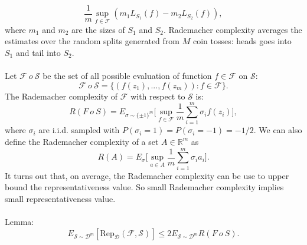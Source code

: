 \documentclass{article}
\begin{document}
   \begin{equation}
   \frac{1}{m} \sup_{f \in \mathcal{F}} (m_1L_{S_1}(f) - m_2L_{S_2}(f)), 
   \end{equation}
   where $m_1$ and $m_2$ are the sizes of $S_1$ and $S_2$. Rademacher complexity averages the estimates over the random splits generated from $M$ coin tosses: heads goes into $S_1$ and tail into $S_2$.
   \\\\
   Let $\mathcal{F}\ o\ \mathcal{S}$ be the set of all possible evaluation of function $f\in \mathcal{F}$ on $\mathcal{S}$:
   \begin{equation}
   \mathcal{F}\ o\ \mathcal{S} = \{ (f(z_1),...,f(z_m)):f\in \mathcal{F} \}.
   \end{equation}
   The Rademacher complexity of $\mathcal{F}$ with respect to $\mathcal{S}$ is:
   \begin{equation}
   R(F\ o\ S) = E_{\sigma \sim \{\pm 1\}^m} \Bigg[ \sup_{f \in \mathcal{F}} \frac{1}{m} \sum_{i=1}^m \sigma_i f(z_i) \Bigg],
   \end{equation}
   where $\sigma_i$ are i.i.d. sampled with $P(\sigma_i = 1) = P(\sigma_i = -1) = -1/2.$ We can also define the Rademacher complexity of a set $A \in \mathbb{R}^m$ as
   \begin{equation}
   R(A) = E_\sigma \Bigg[ \sup_{a \in A} \frac{1}{m} \sum_{i=1}^m \sigma_i a_i \Bigg].
   \end{equation}
   It turns out that, on average, the Rademacher complexity can be use to upper bound the representativeness value. So small Rademacher complexity implies small representativeness value.
   \\\\
   Lemma:
   \begin{equation}
   E_{\mathcal{S}\sim \mathcal{D}^m} [\text{Rep}_\mathcal{D} (\mathcal{F}, \mathcal{S})] \leq 2 E_{\mathcal{S} \sim \mathcal{D}^m} R(F\ o\ S).
   \end{equation}
   
   \clearpage
   
   
\end{document}
